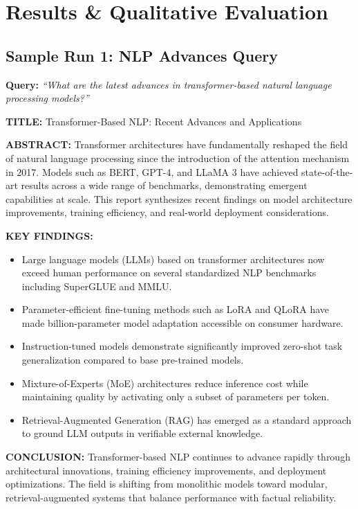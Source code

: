 \documentclass[12pt, a4paper]{article}
\begin{document}
\section{Results \& Qualitative Evaluation}

\subsection{Sample Run 1: NLP Advances Query}

\textbf{Query:} \textit{``What are the latest advances in transformer-based natural language processing models?''}

\begin{outputbox}
\textbf{TITLE:} Transformer-Based NLP: Recent Advances and Applications

\textbf{ABSTRACT:} Transformer architectures have fundamentally reshaped the field of natural language processing since the introduction of the attention mechanism in 2017. Models such as BERT, GPT-4, and LLaMA 3 have achieved state-of-the-art results across a wide range of benchmarks, demonstrating emergent capabilities at scale. This report synthesizes recent findings on model architecture improvements, training efficiency, and real-world deployment considerations.

\textbf{KEY FINDINGS:}
\begin{itemize}
  \item Large language models (LLMs) based on transformer architectures now exceed human performance on several standardized NLP benchmarks including SuperGLUE and MMLU.
  \item Parameter-efficient fine-tuning methods such as LoRA and QLoRA have made billion-parameter model adaptation accessible on consumer hardware.
  \item Instruction-tuned models demonstrate significantly improved zero-shot task generalization compared to base pre-trained models.
  \item Mixture-of-Experts (MoE) architectures reduce inference cost while maintaining quality by activating only a subset of parameters per token.
  \item Retrieval-Augmented Generation (RAG) has emerged as a standard approach to ground LLM outputs in verifiable external knowledge.
\end{itemize}

\textbf{CONCLUSION:} Transformer-based NLP continues to advance rapidly through architectural innovations, training efficiency improvements, and deployment optimizations. The field is shifting from monolithic models toward modular, retrieval-augmented systems that balance performance with factual reliability.
\end{outputbox}
\end{document}
